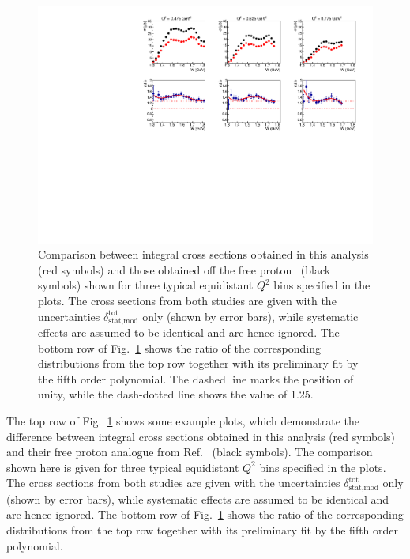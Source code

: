 \begin{figure}[htp]
\begin{center}
\includegraphics[width=\textwidth]{pictures/conclusion/with_fed_comp.pdf}
\caption{\small Comparison between integral cross sections obtained in this analysis (red symbols) and those obtained off the free proton~\cite{Fed_an_note:2017,Fed_paper_2018} (black symbols) shown for three typical equidistant $Q^{2}$ bins specified in the plots. The cross sections from both studies are given with the uncertainties $\delta_{\text{stat,mod}}^{\text{tot}}$ only (shown by error bars), while systematic effects are assumed to be identical and are hence ignored. The bottom row of Fig.~\ref{fig:int_q2_dep} shows the ratio of the corresponding distributions from the top row together with its preliminary fit by the fifth order polynomial. The dashed line marks the position of unity, while the dash-dotted line shows the value of 1.25. } \label{fig:int_q2_dep}
\end{center}
\end{figure}

The top row of Fig.~\ref{fig:int_q2_dep} shows some example plots, which demonstrate the difference between integral cross sections obtained in this analysis (red symbols) and their free proton analogue from Ref.~\cite{Fed_an_note:2017,Fed_paper_2018} (black symbols). The comparison shown here is given for three typical equidistant $Q^{2}$ bins specified in the plots. The cross sections from both studies are given with the uncertainties $\delta_{\text{stat,mod}}^{\text{tot}}$ only (shown by error bars), while systematic effects are assumed to be identical and are hence ignored. The bottom row of Fig.~\ref{fig:int_q2_dep} shows the ratio of the corresponding distributions from the top row together with its preliminary fit by the fifth order polynomial.

